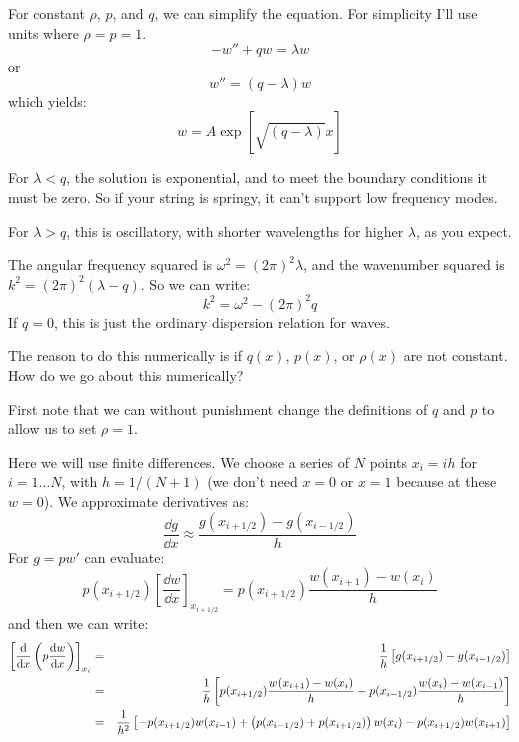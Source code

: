 For constant $\rho$, $p$, and $q$, we can simplify the equation. For
simplicity I'll use units where $\rho = p =1$.
\begin{equation}
- w'' + q w = \lambda w
\end{equation}
or 
\begin{equation}
w'' = (q - \lambda) w
\end{equation}
which yields:
\begin{equation}
w = A \exp\left[\sqrt{(q-\lambda)} x\right]
\end{equation}


\begin{answer}
For $\lambda < q$, the solution is exponential, and to meet the
boundary conditions it must be zero. So if your string is springy, it
can't support low frequency modes.

For $\lambda > q$, this is oscillatory, with shorter wavelengths for
higher $\lambda$, as you expect.
\end{answer}


\begin{answer}
The angular frequency squared is $\omega^2 = (2\pi)^2 \lambda$, and the
wavenumber squared is $k^2 = (2\pi)^2 (\lambda - q)$. So we can write:
\begin{equation}
k^2 = \omega^2 - (2\pi)^2 q
\end{equation}
If $q=0$, this is just the ordinary dispersion relation for waves.
\end{answer}

The reason to do this numerically is if $q(x)$, $p(x)$, or $\rho(x)$
are not constant. How do we go about this numerically?

First note that we can without punishment change the definitions of
$q$ and $p$ to allow us to set $\rho=1$. 

Here we will use finite differences. We choose a series of $N$ points
$x_i = i h $ for $i=1\ldots N$, with $h=1/(N+1)$ (we don't need $x=0$
or $x=1$ because at these $w=0$). We approximate derivatives as:
\begin{equation}
\frac{\dd{g}}{\dd{x}} \approx \frac{g(x_{i+1/2}) - g(x_{i-1/2})}{h}
\end{equation}
For $g=p w'$ can evaluate:
\begin{equation}
p(x_{i+1/2})\left[\frac{\dd{w}}{\dd{x}}\right]_{x_{i+1/2}} =
p(x_{i+1/2}) \frac{w(x_{i+1}) - w(x_i)}{h}
\end{equation}
and then we can write:
\begin{eqnarray}
  \left[\frac{{\rm d}}{{\rm d}x}\left(p\frac{{\rm d}w}{{\rm d}x}\right)\right]_{x_i}
  &=& \frac{1}{h}\left[g(x_{i+1/2}) - g(x_{i-1/2})\right] \cr
  &=& \frac{1}{h}\left[p(x_{i+1/2}) \frac{w(x_{i+1}) - w(x_i)}{h}
    - p(x_{i-1/2}) \frac{w(x_{i}) - w(x_{i-1})}{h}\right] \cr
  &=& \frac{1}{h^2}\left[ - p(x_{i+1/2}) w(x_{i-1})
    + \left(p(x_{i-1/2}) + p(x_{i+1/2})\right) w(x_i)
    - p(x_{i+1/2}) w(x_{i+1})\right]
\end{eqnarray}

